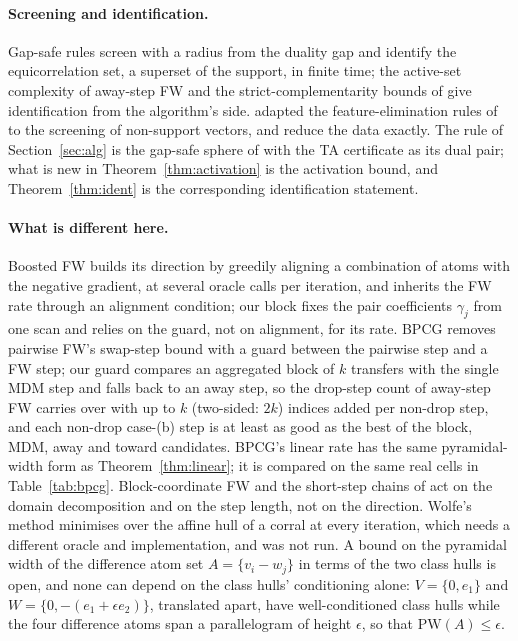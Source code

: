 \documentclass[pdflatex,sn-apa]{sn-jnl}%
\theoremstyle{thmstyleone}
\theoremstyle{thmstyletwo}
\newcommand{\PW}{\mathrm{PW}}
\begin{document}
\paragraph{Screening and identification.} Gap-safe rules
\citep{fercoq2015,ndiaye2017,shibagaki2016} screen with a radius from
the duality gap and identify the equicorrelation set, a superset of the
support, in finite time; the active-set complexity of away-step FW
\citep{bomze2020} and the strict-complementarity bounds of
\citet{garber2020} give identification from the algorithm's side.
\citet{ogawa2013} adapted the feature-elimination rules of
\citet{elghaoui2012} to the screening of non-support vectors, and
\citet{wang2014} reduce the data exactly. The rule of
Section~\ref{sec:alg} is the gap-safe sphere of \citet{ndiaye2017}
with the TA certificate as its dual pair; what is new in
Theorem~\ref{thm:activation} is the activation bound, and
Theorem~\ref{thm:ident} is the corresponding identification statement.

\paragraph{What is different here.} Boosted FW builds its direction by
greedily aligning a combination of atoms with the negative gradient, at
several oracle calls per iteration, and inherits the FW rate through an
alignment condition; our block fixes the pair coefficients $\gamma_j$
from one scan and relies on the guard, not on alignment, for its rate.
BPCG removes pairwise FW's swap-step bound with a guard between the
pairwise step and a FW step; our guard compares an aggregated block of
$k$ transfers with the single MDM step and falls back to an away step,
so the drop-step count of away-step FW carries over with up to $k$
(two-sided: $2k$) indices added per non-drop step, and each non-drop
case-(b) step is at least as good as the best of the block, MDM, away
and toward candidates. BPCG's linear rate has the same pyramidal-width
form as Theorem~\ref{thm:linear}; it is compared on the same real cells
in Table~\ref{tab:bpcg}. Block-coordinate FW and the short-step chains
of \citet{rinaldi2023} act on the domain decomposition and on the step
length, not on the direction. Wolfe's method minimises over the affine
hull of a corral at every iteration, which needs a different oracle
and implementation, and was not run. A bound on the pyramidal width of the difference atom set
$A=\{v_i-w_j\}$ in terms of the two class hulls is open, and none can depend on the class hulls' conditioning alone: $V=\{0,e_1\}$ and $W=\{0,-(e_1+\epsilon e_2)\}$,
translated apart, have well-conditioned class hulls while the four
difference atoms span a parallelogram of height $\epsilon$, so that
$\PW(A)\le\epsilon$.
\end{document}
